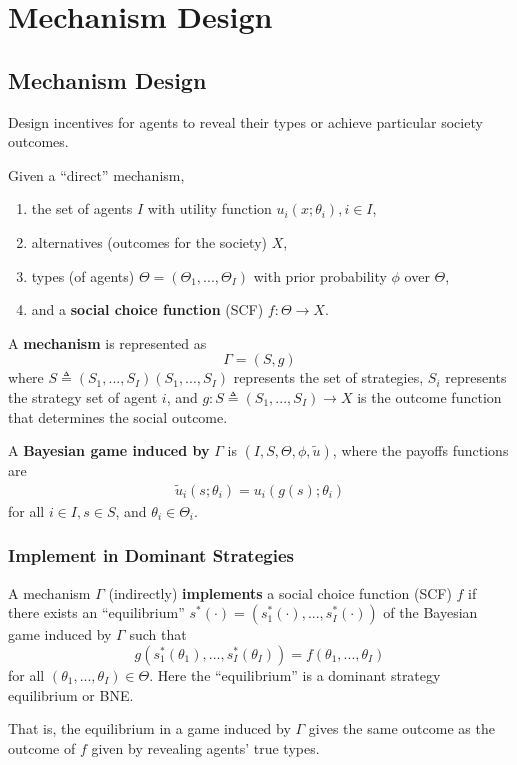 \documentclass[11pt]{elegantbook}
\begin{document}
\chapter{Mechanism Design}

\section{Mechanism Design}
Design incentives for agents to reveal their types or achieve particular society outcomes.

Given a ``direct'' mechanism,
\begin{enumerate}
    \item the set of agents $I$ with utility function $u_i(x;\theta_i),i\in I$,
    \item alternatives (outcomes for the society) $X$,
    \item  types (of agents) $\Theta=(\Theta_1,...,\Theta_I)$ with prior probability $\phi$ over $\Theta$,
    \item and a \textbf{social choice function} (SCF) $f:\Theta\rightarrow X$.
\end{enumerate}

\begin{definition}[Mechanism $\Gamma=(S,g)$]
    \normalfont
    A \textbf{mechanism} is represented as $$\Gamma=\left(S, g\right)$$
    where $S\triangleq(S_1,...,S_I)(S_1,...,S_I)$ represents the set of strategies, $S_i$ represents the strategy set of agent $i$, and $g:S\triangleq(S_1,...,S_I) \rightarrow X$ is the outcome function that determines the social outcome.
\end{definition}

A \textbf{Bayesian game induced by} $\Gamma$ is $(I,S,\Theta,\phi,\tilde{u})$, where the payoffs functions are
\begin{equation}
    \begin{aligned}
        \tilde{u}_i(s;\theta_i)=u_i(g(s);\theta_i)
    \end{aligned}
    \nonumber
\end{equation}
for all $i\in I, s\in S$, and $\theta_i\in\Theta_i$.


\subsection{Implement in Dominant Strategies}
\begin{definition}
    \normalfont
    A mechanism $\Gamma$ (indirectly) \textbf{implements} a social choice function (SCF) $f$ if there exists an ``equilibrium'' $s^*(\cdot)=\left(s_1^*(\cdot),...,s_I^*(\cdot)\right)$ of the Bayesian game induced by $\Gamma$ such that $$g(s_1^*(\theta_1),...,s_I^*(\theta_I))=f(\theta_1,...,\theta_I)$$ for all $(\theta_1,...,\theta_I)\in \Theta$. Here the ``equilibrium'' is a dominant strategy equilibrium or BNE.
\end{definition}
That is, the equilibrium in a game induced by $\Gamma$ gives the same outcome as the outcome of $f$ given by revealing agents' true types.
\end{document}
